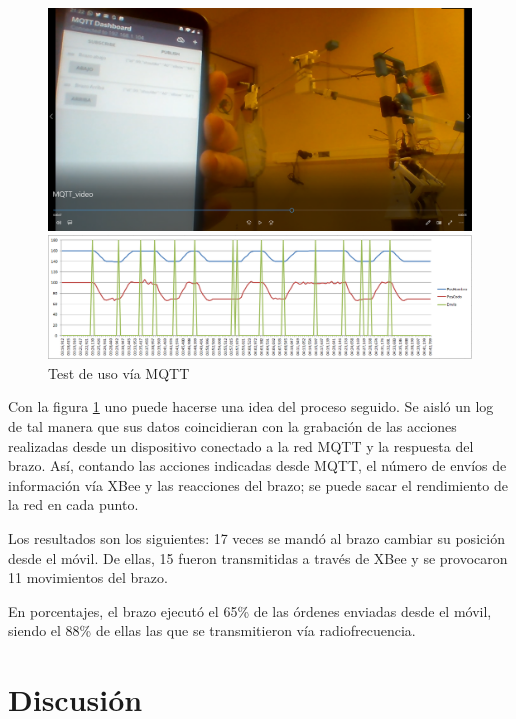 \begin{figure}[tb]
  \centering
  \begin{minipage}[H]{1\textwidth}
    \includegraphics[width=\textwidth]{figuras/MQTTVideo.png}
  \end{minipage}
  \begin{minipage}[H]{1.1\textwidth}
    \includegraphics[width=\textwidth]{figuras/tmqtt.png}
  \end{minipage}
  \caption{Test de uso vía MQTT}\label{fig:tmqtt}
\end{figure}

Con la figura \ref{fig:tmqtt} uno puede hacerse una idea del proceso seguido. Se aisló un log de tal manera que sus datos coincidieran con la grabación de las acciones realizadas desde un dispositivo conectado a la red MQTT y la respuesta del brazo. Así, contando las acciones indicadas desde MQTT, el número de envíos de información vía XBee y las reacciones del brazo; se puede sacar el rendimiento de la red en cada punto.

Los resultados son los siguientes: 17 veces se mandó al brazo cambiar su posición desde el móvil. De ellas, 15 fueron transmitidas a través de XBee y se provocaron 11 movimientos del brazo.

En porcentajes, el brazo ejecutó el 65\% de las órdenes enviadas desde el móvil, siendo el 88\% de ellas las que se transmitieron vía radiofrecuencia.

\section{Discusión}

